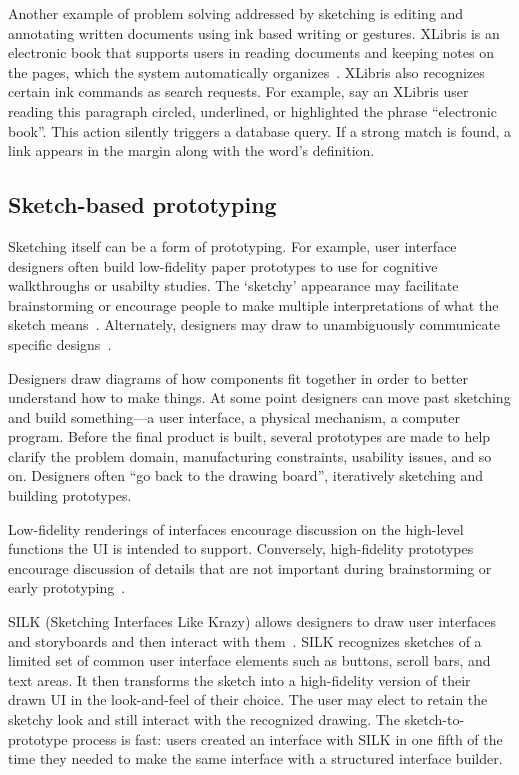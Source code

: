 Another example of problem solving addressed by sketching is editing
and annotating written documents using ink based writing or
gestures. XLibris is an electronic book that supports users in reading
documents and keeping notes on the pages, which the system
automatically organizes~\cite{schilit-xlibris}. XLibris also
recognizes certain ink commands as search requests. For example, say
an XLibris user reading this paragraph circled, underlined, or
highlighted the phrase ``electronic book''. This action silently
triggers a database query. If a strong match is found, a link appears
in the margin along with the word's definition.

\subsection{Sketch-based prototyping}
\label{sec:interaction-prototype-computer}

Sketching itself can be a form of prototyping. For example, user
interface designers often build low-fidelity paper prototypes to use
for cognitive walkthroughs or usabilty studies. The `sketchy'
appearance may facilitate brainstorming or encourage people to make
multiple interpretations of what the sketch
means~\cite{do-design-sketches-tools}. Alternately, designers may draw
to unambiguously communicate specific
designs~\cite{newman-web-designers}.

Designers draw diagrams of how components fit together in order to
better understand how to make things. At some point designers can move
past sketching and build something---a user interface, a physical
mechanism, a computer program. Before the final product is built,
several prototypes are made to help clarify the problem domain,
manufacturing constraints, usability issues, and so on. Designers
often ``go back to the drawing board'', iteratively sketching and
building prototypes.

Low-fidelity renderings of interfaces encourage discussion on the
high-level functions the UI is intended to support. Conversely,
high-fidelity prototypes encourage discussion of details that are not
important during brainstorming or early
prototyping~\cite{wong-rr-prototypes,black-fidelity}.

SILK (Sketching Interfaces Like Krazy) allows designers to draw user
interfaces and storyboards and then interact with
them~\cite{landay-silk}. SILK recognizes sketches of a limited set of
common user interface elements such as buttons, scroll bars, and text
areas. It then transforms the sketch into a high-fidelity version of
their drawn UI in the look-and-feel of their choice. The user may
elect to retain the sketchy look and still interact with the
recognized drawing. The sketch-to-prototype process is fast: users
created an interface with SILK in one fifth of the time they needed to
make the same interface with a structured interface builder.

